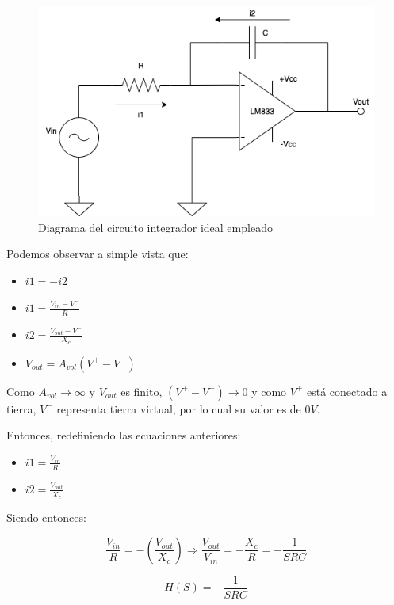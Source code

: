 \begin{figure}[H]
    \centering 
    \includegraphics [scale=0.5] {../Ejercicio3-CircuitoIntegradoresyDerivadores/Imagenes/diagrama-integrador-corrientes.png} 
    \caption{Diagrama del circuito integrador ideal empleado}
    \label{fig:emptyPlotTool}
\end{figure}

Podemos observar a simple vista que:

\begin{itemize}
	\item $i1 = -i2$
	\item $i1 = \frac {V_{in}-V^{-}}{R} $
	\item $i2 = \frac {V_{out}-V^{-}}{X_c}$
	\item $V_{out} = A_{vol}(V^{+}-V^{-})$
\end{itemize}

Como ${A_{vol} \to \infty}$ y $V_{out}$ es finito, ${(V^{+}-V^{-}) \to 0}$ y como $V^{+}$ está conectado a tierra,
$V^{-}$ representa tierra virtual, por lo cual su valor es de $0V$.

Entonces, redefiniendo las ecuaciones anteriores:

\begin{itemize}
	\item $i1 = \frac{V_{in}}{R} $
	\item $i2 = \frac {V_{out}}{X_c}$
\end{itemize}

Siendo entonces:

$$ \frac{V_{in}}{R} = - (\frac{V_{out}}{X_c}) \Longrightarrow \frac{V_{out}}{V_{in}} = -\frac{X_c}{R} = - \frac{1}{SRC}$$

$$ H(S) = - \frac{1}{SRC}$$


